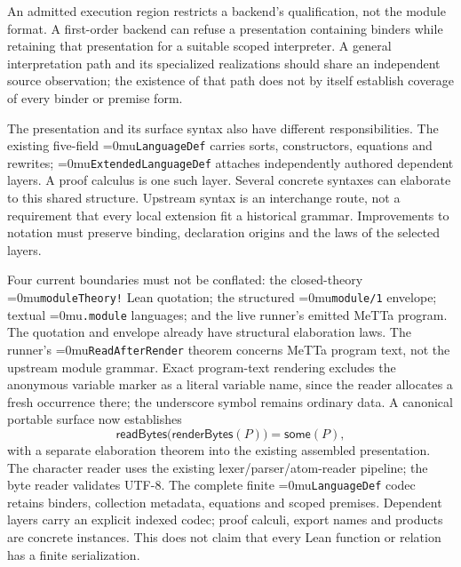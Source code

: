 \documentclass[11pt,a4paper]{article}
\newcommand{\name}[1]{\textup{\Urlmuskip=0mu\relax\nolinkurl{#1}}}
\begin{document}
\begin{center}
\end{center}

An admitted execution region restricts a backend's qualification, not the
module format. A first-order backend can refuse a presentation containing
binders while retaining that presentation for a suitable scoped interpreter.
A general interpretation path and its specialized realizations should share
an independent source observation; the existence of that path does not by
itself establish coverage of every binder or premise form.

The presentation and its surface syntax also have different responsibilities.
The existing five-field \name{LanguageDef} carries sorts, constructors,
equations and rewrites; \name{ExtendedLanguageDef} attaches independently
authored dependent layers. A proof calculus is one such layer. Several concrete
syntaxes can elaborate to this shared structure. Upstream syntax is an
interchange route, not a requirement that every local extension fit a
historical grammar. Improvements to notation must preserve binding, declaration
origins and the laws of the selected layers.

Four current boundaries must not be conflated: the closed-theory
\name{moduleTheory!} Lean quotation; the structured \name{module/1} envelope;
textual \name{.module} languages; and the live runner's emitted MeTTa program.
The quotation and envelope already have structural elaboration laws. The
runner's \name{ReadAfterRender} theorem concerns MeTTa program text, not the
upstream module grammar. Exact program-text rendering excludes the anonymous
variable marker as a literal variable name, since the reader allocates a
fresh occurrence there; the underscore symbol remains ordinary data.
A canonical portable surface now establishes
\[
  \mathsf{readBytes}\bigl(\mathsf{renderBytes}(P)\bigr)
    =\mathsf{some}(P),
\]
with a separate elaboration theorem into the existing assembled presentation.
The character reader uses the existing lexer/parser/atom-reader pipeline;
the byte reader validates UTF-8. The complete finite \name{LanguageDef}
codec retains binders, collection metadata, equations and scoped premises.
Dependent layers carry an explicit indexed codec; proof calculi, export
names and products are concrete instances. This does not claim that every
Lean function or relation has a finite serialization.
\end{document}
